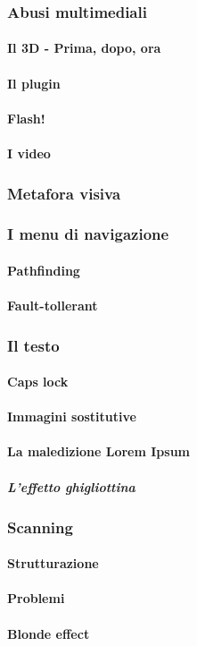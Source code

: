 		\subsubsection{Abusi multimediali}
			\paragraph{Il 3D - Prima, dopo, ora}
			\paragraph{Il plugin}
			\paragraph{Flash!}
			\paragraph{I video}
		
		\subsubsection{Metafora visiva}
		
		\subsubsection{I menu di navigazione}
			\paragraph{Pathfinding}
			\paragraph{Fault-tollerant}
			
		\subsubsection{Il testo}
			
			\paragraph{Caps lock}
			\paragraph{Immagini sostitutive}
			\paragraph{La maledizione Lorem Ipsum}
				\subparagraph{L'effetto ghigliottina}
				
		\subsubsection{Scanning}
			\paragraph{Strutturazione}
			\paragraph{Problemi}
			\paragraph{Blonde effect}		